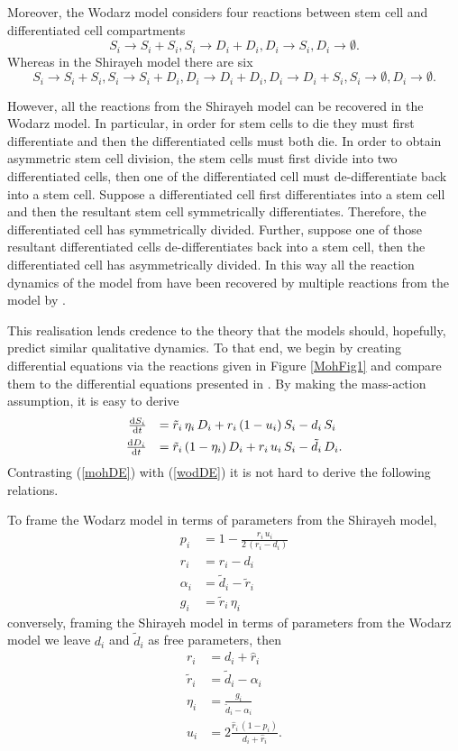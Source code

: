 \documentclass[12pt]{article}
\renewcommand{\d}{{\rm d}}
\begin{document}
Moreover, the Wodarz model considers four reactions between stem cell and differentiated cell compartments \[S_i\to S_i+S_i, S_i\to D_i+D_i, D_i\to S_i, D_i\to \emptyset.\] Whereas in the Shirayeh model there are six
\[
S_i\to S_i+S_i, S_i\to S_i+D_i, D_i\to D_i+D_i, D_i\to D_i+S_i, S_i\to\emptyset, D_i\to\emptyset.
\]

However, all the reactions from the Shirayeh model can be recovered in the Wodarz model. In particular, in order for stem cells to die they must first differentiate and then the differentiated cells must both die. In order to obtain asymmetric stem cell division, the stem cells must first divide into two differentiated cells, then one of the differentiated cell must de-differentiate back into a stem cell. Suppose a differentiated cell first differentiates into a stem cell and then the resultant stem cell symmetrically differentiates. Therefore, the differentiated cell has symmetrically divided. Further, suppose one of those resultant differentiated cells de-differentiates back into a stem cell, then the differentiated cell has asymmetrically divided. In this way all the reaction dynamics of the model from \cite{mohammad} have been recovered by multiple reactions from the model by \cite{wodarz}.

This realisation lends credence to the theory that the models should, hopefully, predict similar qualitative dynamics. To that end, we begin by creating differential equations via the reactions given in Figure \ref{MohFig1} and compare them to the differential equations presented in \cite{wodarz}. By making the mass-action assumption, it is easy to derive
\begin{equation}
\begin{array}{rl}
\frac{\d S_i}{\d t}&=\tilde{r}_i\,\eta_i\,D_i+r_i\,(1-u_i)\,S_i-d_i\,S_i\vspace*{5pt}\\
\frac{\d D_i}{\d t}&=\tilde{r}_i\,(1-\eta_i)\,D_i+r_i\,u_i\,S_i-\tilde{d}_i\,D_i.
\end{array}
\end{equation}\label{mohDE}
Contrasting (\ref{mohDE}) with (\ref{wodDE}) it is not hard to derive the following relations.

To frame the Wodarz model in terms of parameters from the Shirayeh model,
\begin{align*}
p_i&=1-\frac{r_i\,u_i}{2\,(r_i-d_i)}\\
\hat{r}_i&=r_i-d_i\\
\alpha_i&=\tilde{d}_i-\tilde{r}_i\\
g_i&=\tilde{r}_i\,\eta_i
\end{align*}
conversely, framing the Shirayeh model in terms of parameters from the Wodarz model we leave $d_i$ and $\tilde{d}_i$ as free parameters, then
\begin{align*}
r_i&=d_i+\hat{r}_i\\
\tilde{r}_i&=\tilde{d}_i-\alpha_i\\
\eta_i&=\frac{g_i}{\tilde{d}_i-\alpha_i}\\
u_i&=2\frac{\hat{r}_i\,(1-p_i)}{d_i+\hat{r}_i}.
\end{align*}
\end{document}
